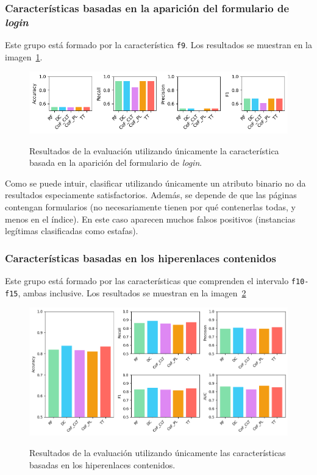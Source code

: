 \subsubsection{Características basadas en la aparición del formulario de \textit{login}}
Este grupo está formado por la característica \texttt{f9}. Los resultados se muestran en la imagen~\ref{gr:ph-f9_small}.

\begin{figure}[h]
	\caption[\textit{Phishing}: detección (\texttt{f9})]{Resultados de la evaluación utilizando únicamente la característica basada en la aparición del formulario de \textit{login}.}
	\centering
	\includegraphics[width=\textwidth]{../img/memoria/5_phishing/f9_small}
	\label{gr:ph-f9_small}
\end{figure}

Como se puede intuir, clasificar utilizando únicamente un atributo binario no da resultados especiamente satisfactorios. Además, se depende de que las páginas contengan formularios (no necesariamente tienen por qué contenerlas todas, y menos en el índice). En este caso aparecen muchos falsos positivos (instancias legítimas clasificadas como estafas).

\subsubsection{Características basadas en los hiperenlaces contenidos}
Este grupo está formado por las características que comprenden el intervalo \texttt{f10-f15}, ambas inclusive. Los resultados se muestran en la imagen~\ref{gr:ph-f10f15_small}

\begin{figure}[h]
	\caption[\textit{Phishing}: detección (\texttt{f10-f15})]{Resultados de la evaluación utilizando únicamente las características basadas en los hiperenlaces contenidos.}
	\centering
	\includegraphics[width=\textwidth]{../img/memoria/5_phishing/f10f15_big}
	\label{gr:ph-f10f15_small}
\end{figure}

